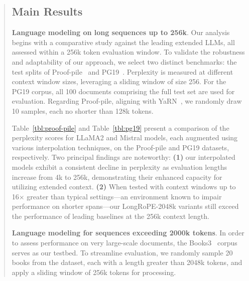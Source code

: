 \begin{abstract}
\subsection{Main Results}

\label{sec:mainresult}
\textbf{Language modeling on long sequences up to 256k}. Our analysis begins with a comparative study against the leading extended LLMs, all assessed within a 256k token evaluation window. To validate the robustness and adaptability of our approach, we select two distinct benchmarks: the test splits of Proof-pile~\cite{pg19} and PG19~\cite{pile}. Perplexity is measured at different context window sizes, leveraging a sliding window of size 256. For the PG19 corpus, all 100 documents comprising the full test set are used for evaluation. Regarding Proof-pile, aligning with YaRN~\cite{yarn}, we randomly draw 10 samples, each no shorter than 128k tokens.

Table~\ref{tbl:proof-pile} and Table~\ref{tbl:pg19} present a comparison of the perplexity scores for LLaMA2 and Mistral models, each augmented using various interpolation techniques, on the Proof-pile and PG19 datasets, respectively. Two principal findings are noteworthy: \textbf{(1)} our interpolated models exhibit a consistent decline in perplexity as evaluation lengths increase from 4k to 256k, demonstrating their enhanced capacity for utilizing extended context. \textbf{(2)} When tested with context windows up to 16$\times$ greater than typical settings—an environment known to impair performance on shorter spans—our LongRoPE-2048k variants still exceed the performance of leading baselines at the 256k context length.

\textbf{Language modeling for sequences exceeding 2000k tokens}. In order to assess performance on very large-scale documents, the Books3~\cite{pile} corpus serves as our testbed. To streamline evaluation, we randomly sample 20 books from the dataset, each with a length greater than 2048k tokens, and apply a sliding window of 256k tokens for processing.


\end{abstract}
